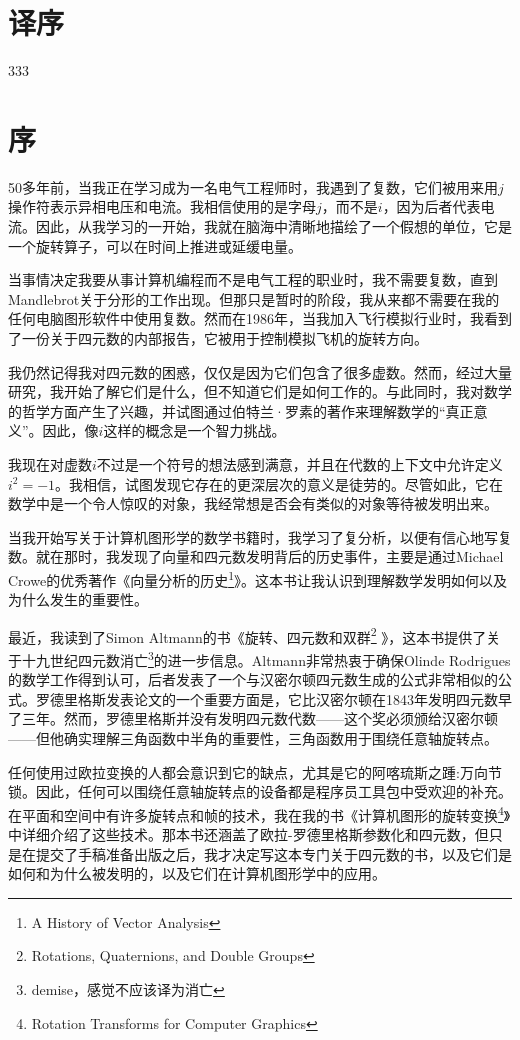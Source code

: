 \section*{译序}
333

\newpage
\section*{序}
50多年前，当我正在学习成为一名电气工程师时，我遇到了复数，它们被用来用$j$操作符表示异相电压和电流。我相信使用的是字母$j$，而不是$ i $，因为后者代表电流。因此，从我学习的一开始，我就在脑海中清晰地描绘了一个假想的单位，它是一个旋转算子，可以在时间上推进或延缓电量。


当事情决定我要从事计算机编程而不是电气工程的职业时，我不需要复数，直到Mandlebrot关于分形的工作出现。但那只是暂时的阶段，我从来都不需要在我的任何电脑图形软件中使用复数。然而在1986年，当我加入飞行模拟行业时，我看到了一份关于四元数的内部报告，它被用于控制模拟飞机的旋转方向。

我仍然记得我对四元数的困惑，仅仅是因为它们包含了很多虚数。然而，经过大量研究，我开始了解它们是什么，但不知道它们是如何工作的。与此同时，我对数学的哲学方面产生了兴趣，并试图通过伯特兰·罗素的著作来理解数学的“真正意义”。因此，像$i$这样的概念是一个智力挑战。

我现在对虚数$ i $不过是一个符号的想法感到满意，并且在代数的上下文中允许定义$ i ^{2}=-1$。我相信，试图发现它存在的更深层次的意义是徒劳的。尽管如此，它在数学中是一个令人惊叹的对象，我经常想是否会有类似的对象等待被发明出来。

当我开始写关于计算机图形学的数学书籍时，我学习了复分析，以便有信心地写复数。就在那时，我发现了向量和四元数发明背后的历史事件，主要是通过Michael Crowe的优秀著作《向量分析的历史\footnote{ A History of Vector Analysis}》。这本书让我认识到理解数学发明如何以及为什么发生的重要性。


最近，我读到了Simon Altmann的书《旋转、四元数和双群\footnote{Rotations, Quaternions, and Double Groups} 》，这本书提供了关于十九世纪四元数消亡\footnote{demise，感觉不应该译为消亡}的进一步信息。Altmann非常热衷于确保Olinde Rodrigues的数学工作得到认可，后者发表了一个与汉密尔顿四元数生成的公式非常相似的公式。罗德里格斯发表论文的一个重要方面是，它比汉密尔顿在1843年发明四元数早了三年。然而，罗德里格斯并没有发明四元数代数——这个奖必须颁给汉密尔顿——但他确实理解三角函数中半角的重要性，三角函数用于围绕任意轴旋转点。

任何使用过欧拉变换的人都会意识到它的缺点，尤其是它的阿喀琉斯之踵:万向节锁。因此，任何可以围绕任意轴旋转点的设备都是程序员工具包中受欢迎的补充。在平面和空间中有许多旋转点和帧的技术，我在我的书《计算机图形的旋转变换\footnote{Rotation Transforms for Computer Graphics}》中详细介绍了这些技术。那本书还涵盖了欧拉-罗德里格斯参数化和四元数，但只是在提交了手稿准备出版之后，我才决定写这本专门关于四元数的书，以及它们是如何和为什么被发明的，以及它们在计算机图形学中的应用。

